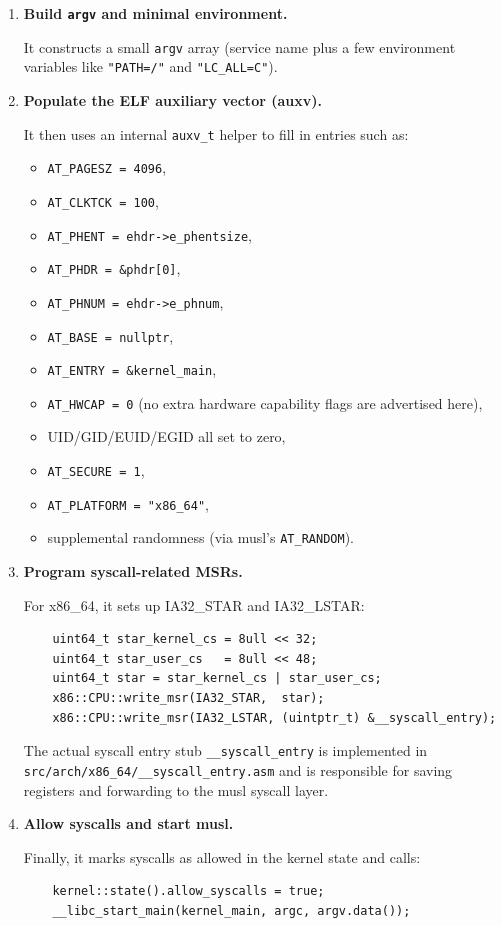 \documentclass[a4paper,11pt]{article}
\begin{document}
\begin{enumerate}
  \item \textbf{Build \texttt{argv} and minimal environment.}  

    It constructs a small \texttt{argv} array (service name plus a few
    environment variables like \texttt{"PATH=/"} and \texttt{"LC\_ALL=C"}).

  \item \textbf{Populate the ELF auxiliary vector (auxv).}  

    It then uses an internal \texttt{auxv\_t} helper to fill in entries
    such as:

    \begin{itemize}
      \item \texttt{AT\_PAGESZ = 4096},
      \item \texttt{AT\_CLKTCK = 100},
      \item \texttt{AT\_PHENT = ehdr->e\_phentsize},
      \item \texttt{AT\_PHDR = \&phdr[0]},
      \item \texttt{AT\_PHNUM = ehdr->e\_phnum},
      \item \texttt{AT\_BASE = nullptr},
      \item \texttt{AT\_ENTRY = \&kernel\_main},
      \item \texttt{AT\_HWCAP = 0} (no extra hardware capability flags are
            advertised here),
      \item UID/GID/EUID/EGID all set to zero,
      \item \texttt{AT\_SECURE = 1},
      \item \texttt{AT\_PLATFORM = "x86\_64"},
      \item supplemental randomness (via musl’s \texttt{AT\_RANDOM}).
    \end{itemize}

  \item \textbf{Program syscall-related MSRs.}  

    For x86\_64, it sets up IA32\_STAR and IA32\_LSTAR:

    \begin{verbatim}
    uint64_t star_kernel_cs = 8ull << 32;
    uint64_t star_user_cs   = 8ull << 48;
    uint64_t star = star_kernel_cs | star_user_cs;
    x86::CPU::write_msr(IA32_STAR,  star);
    x86::CPU::write_msr(IA32_LSTAR, (uintptr_t) &__syscall_entry);
    \end{verbatim}

    The actual syscall entry stub \texttt{\_\_syscall\_entry} is implemented in
    \texttt{src/arch/x86\_64/\_\_syscall\_entry.asm} and is responsible
    for saving registers and forwarding to the musl syscall layer.

  \item \textbf{Allow syscalls and start musl.}  

    Finally, it marks syscalls as allowed in the kernel state and calls:

    \begin{verbatim}
    kernel::state().allow_syscalls = true;
    __libc_start_main(kernel_main, argc, argv.data());
    \end{verbatim}
\end{enumerate}
\end{document}
